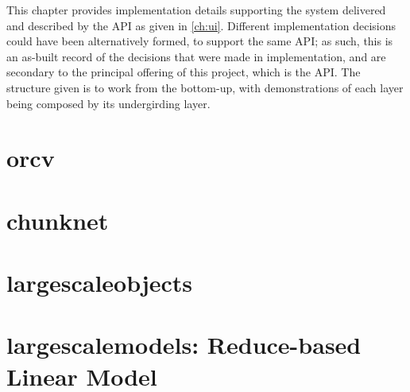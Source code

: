 This chapter provides implementation details supporting the system delivered and described by the API as given in \cref{ch:ui}.
Different implementation decisions could have been alternatively formed, to support the same API; as such, this is an as-built record of the decisions that were made in implementation, and are secondary to the principal offering of this project, which is the API.
The structure given is to work from the bottom-up, with demonstrations of each layer being composed by its undergirding layer.

\section{orcv}

\section{chunknet}

\section{largescaleobjects}

\section{largescalemodels: Reduce-based Linear Model}


